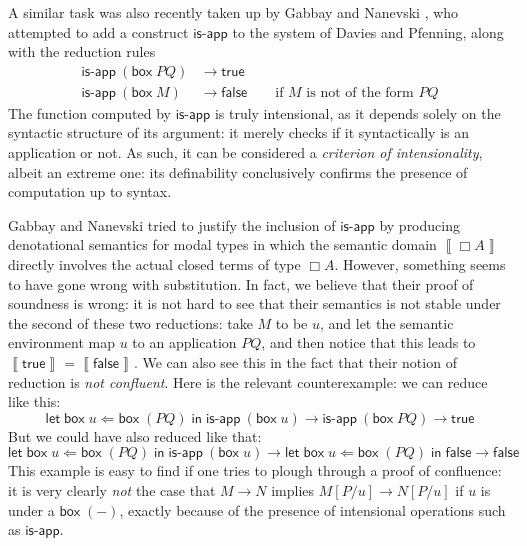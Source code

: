 \documentclass{myifcolog}
\theoremstyle{definition}
\newcommand{\sem}[2]{\left\llbracket #1 \right\rrbracket^{#2}}
\newcommand{\ibox}[1]{\mathsf{box\;}#1}
\newcommand{\letbox}[3]{\mathsf{let\;box\;} #1 \Leftarrow #2 \mathsf{\;in\;} #3}
\newcommand{\red}{\mathrel{\longrightarrow}}
\begin{document}
A similar task was also recently taken up by Gabbay and Nanevski
\cite{Gabbay2013}, who attempted to add a construct
$\textsf{is-app}$ to the system of Davies and Pfenning, along with
the reduction rules \begin{align*}
  \textsf{is-app}\ (\ibox{PQ}) &\red{} \mathsf{true} \\
  \textsf{is-app}\ (\ibox{M})  &\red{} \mathsf{false}
    \qquad \text{if $M$ is not of the form $PQ$}
\end{align*} The function computed by $\textsf{is-app}$ is truly
intensional, as it depends solely on the syntactic structure of
its argument: it merely checks if it syntactically is an
application or not. As such, it can be considered a
\emph{criterion of intensionality}, albeit an extreme one: its
definability conclusively confirms the presence of computation up
to syntax.

Gabbay and Nanevski tried to justify the inclusion of
$\textsf{is-app}$ by producing denotational semantics for modal
types in which the semantic domain $\sem{\Box A}{}$ directly
involves the actual closed terms of type $\Box A$. However,
something seems to have gone wrong with substitution. In fact, we
believe that their proof of soundness is wrong: it is not hard to
see that their semantics is not stable under the second of these
two reductions: take $M$ to be $u$, and let the semantic
environment map $u$ to an application $PQ$, and then notice that
this leads to $\sem{\mathsf{true}}{} = \sem{\mathsf{false}}{}$. We
can also see this in the fact that their notion of reduction is
\emph{not confluent}. Here is the relevant counterexample: we can
reduce like this: \[
  \letbox{u}{\ibox{(PQ)}}{\textsf{is-app}\ (\ibox{u})}
    \red{}
  \textsf{is-app}\ (\ibox{PQ})
    \red{}
  \mathsf{true}
\] But we could have also reduced like that: \[
  \letbox{u}{\ibox{(PQ)}}{\textsf{is-app}\ (\ibox{u})}
    \red{}
  \letbox{u}{\ibox{(PQ)}}{\mathsf{false}}
    \red{}
  \mathsf{false}
\] This example is easy to find if one tries to plough through a
proof of confluence: it is very clearly \emph{not} the case that
$M \red{} N$ implies $M[P/u] \red{} N[P/u]$ if $u$ is under a
$\ibox{(-)}$, exactly because of the presence of intensional
operations such as $\textsf{is-app}$.
\end{document}
